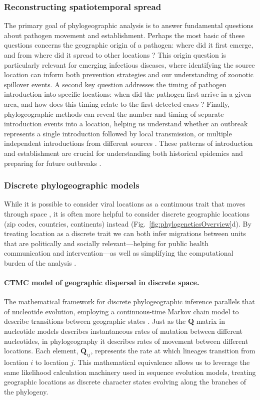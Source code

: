 \subsubsection{Reconstructing spatiotemporal spread}
The primary goal of phylogeographic analysis is to answer fundamental questions about pathogen movement and establishment.
Perhaps the most basic of these questions concerns the geographic origin of a pathogen: where did it first emerge, and from where did it spread to other locations \citep{dudas2017virus}?
This origin question is particularly relevant for emerging infectious diseases, where identifying the source location can inform both prevention strategies and our understanding of zoonotic spillover events.
A second key question addresses the timing of pathogen introduction into specific locations: when did the pathogen first arrive in a given area, and how does this timing relate to the first detected cases \citep{bedford2020cryptic}?
Finally, phylogeographic methods can reveal the number and timing of separate introduction events into a location, helping us understand whether an outbreak represents a single introduction followed by local transmission, or multiple independent introductions from different sources \citep{black2019genomic}.
These patterns of introduction and establishment are crucial for understanding both historical epidemics and preparing for future outbreaks \citep{kocher2021ten,gass2023global}.

\subsubsection{Discrete phylogeographic models}
While it is possible to consider viral locations as a continuous trait that moves through space \citep{lemey2010phylogeography}, it is often more helpful to consider discrete geographic locations (zip codes, countries, continents) instead (Fig.~\ref{fig:phylogeneticsOverview}d).
By treating location as a discrete trait we can both infer migrations between units that are politically and socially relevant---helping for public health communication and intervention---as well as simplifying the computational burden of the analysis \citep{lemey2009bayesian,faria2011toward}.

\paragraph*{CTMC model of geographic dispersal in discrete space.}
The mathematical framework for discrete phylogeographic inference parallels that of nucleotide evolution, employing a continuous-time Markov chain model to describe transitions between geographic states \citep{lemey2009bayesian}.
Just as the $\mathbf{Q}$ matrix in nucleotide models describes instantaneous rates of mutation between different nucleotides, in phylogeography it describes rates of movement between different locations.
Each element, $\mathbf{Q}_{ij}$, represents the rate at which lineages transition from location $i$ to location $j$.
This mathematical equivalence allows us to leverage the same likelihood calculation machinery used in sequence evolution models, treating geographic locations as discrete character states evolving along the branches of the phylogeny.

